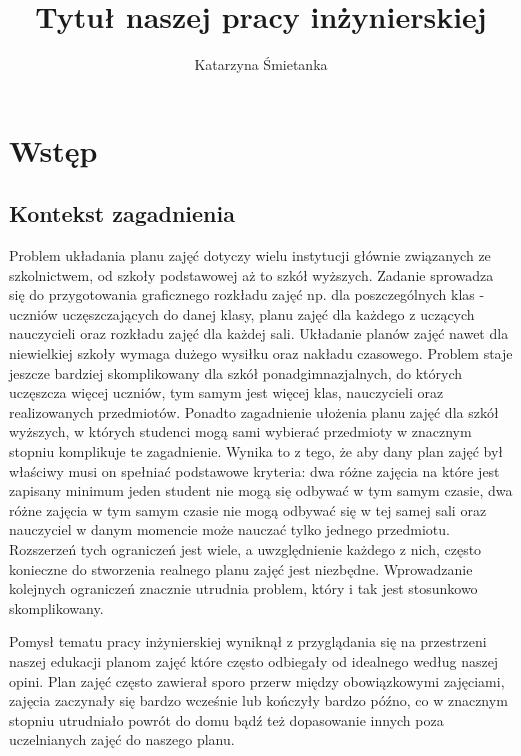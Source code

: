 \documentclass[11pt]{report}
\title{Tytuł naszej pracy inżynierskiej}
\begin{document}
%
%

\maketitle
\tableofcontents

\chapter{Wstęp}

\section{Kontekst zagadnienia}
\author{Katarzyna Śmietanka}
\par Problem układania planu zajęć dotyczy wielu instytucji głównie związanych ze szkolnictwem, od szkoły podstawowej aż to szkół wyższych. Zadanie sprowadza się do przygotowania graficznego rozkładu zajęć np. dla poszczególnych klas - uczniów uczęszczających do danej klasy, planu zajęć dla każdego z uczących nauczycieli oraz rozkładu zajęć dla każdej sali. Układanie planów zajęć nawet dla niewielkiej szkoły wymaga dużego wysiłku oraz nakładu czasowego. Problem staje jeszcze bardziej skomplikowany dla szkół ponadgimnazjalnych, do których uczęszcza więcej uczniów, tym samym jest więcej klas, nauczycieli oraz realizowanych przedmiotów. Ponadto zagadnienie ułożenia planu zajęć dla szkół wyższych, w których studenci mogą sami wybierać przedmioty w znacznym stopniu komplikuje te zagadnienie. Wynika to z tego, że aby dany plan zajęć był właściwy musi on spełniać podstawowe kryteria: dwa różne zajęcia na które jest zapisany minimum jeden student nie mogą się odbywać w tym samym czasie, dwa różne zajęcia w tym samym czasie nie mogą odbywać się w tej samej sali oraz nauczyciel w danym momencie może nauczać tylko jednego przedmiotu. Rozszerzeń tych ograniczeń jest wiele, a uwzględnienie każdego z nich, często konieczne do stworzenia realnego planu zajęć jest niezbędne. Wprowadzanie kolejnych ograniczeń znacznie utrudnia problem, który i tak jest stosunkowo skomplikowany.
\par Pomysł tematu pracy inżynierskiej wyniknął z przyglądania się na przestrzeni naszej edukacji planom zajęć które często odbiegały od idealnego według naszej opini. Plan zajęć często zawierał sporo przerw między obowiązkowymi zajęciami, zajęcia zaczynały się bardzo wcześnie lub kończyły bardzo późno, co w znacznym stopniu utrudniało powrót do domu bądź też dopasowanie innych poza uczelnianych zajęć do naszego planu.
\end{document}
